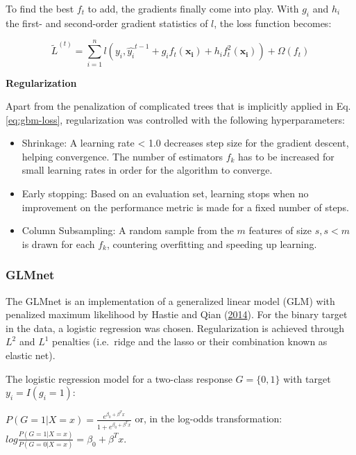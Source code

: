 \documentclass[
  11pt,
  a4paper,
  DIV=12,captions=tableheading,oneside]{scrbook}
\providecommand{\tightlist}{%
  \setlength{\itemsep}{0pt}\setlength{\parskip}{0pt}}
\providecommand{\tightlist}{%
  \setlength{\itemsep}{0pt}\setlength{\parskip}{0pt}}
\begin{document}
To find the best \(f_t\) to add, the gradients finally come into play. With \(g_i\) and \(h_i\) the first- and second-order gradient statistics of \(l\), the loss function becomes:

\begin{equation}
\tilde{L}^{(t)} = \sum_{i=1}^n l(y_i, \hat{y_i}^{t-1} + g_if_t(\mathbf{x_i}) + h_i f_t^2(\mathbf{x_i})) +\Omega(f_t)
\label{eq:gbm-grad}
\end{equation}

\textbf{Regularization}

Apart from the penalization of complicated trees that is implicitly applied in Eq. \eqref{eq:gbm-loss}, regularization was controlled with the following hyperparameters:

\begin{itemize}
\tightlist
\item
  Shrinkage: A learning rate \textless{} 1.0 decreases step size for the gradient descent, helping convergence. The number of estimators \(f_k\) has to be increased for small learning rates in order for the algorithm to converge.
\item
  Early stopping: Based on an evaluation set, learning stops when no improvement on the performance metric is made for a fixed number of steps.
\item
  Column Subsampling: A random sample from the \(m\) features of size \(s, s < m\) is drawn for each \(f_k\), countering overfitting and speeding up learning.
\end{itemize}

\hypertarget{glmnet}{%
\subsubsection{GLMnet}\label{glmnet}}

The GLMnet is an implementation of a generalized linear model (GLM) with penalized maximum likelihood by Hastie and Qian (\protect\hyperlink{ref-hastie2014glmnet}{2014}). For the binary target in the data, a logistic regression was chosen. Regularization is achieved through \(L^2\) and \(L^1\) penalties (i.e.~ridge and the lasso or their combination known as elastic net).

The logistic regression model for a two-class response \(G = \{0,1\}\) with target \(y_i = I(g_i=1)\):

\(P(G=1|X=x) = \frac{e^{\beta_0+\beta^Tx}}{1+e^{\beta_0+\beta^Tx}}\) or, in the log-odds transformation: \(log\frac{P(G=1|X=x)}{P(G=0|X=x)}=\beta_0+\beta^Tx\).
\end{document}
